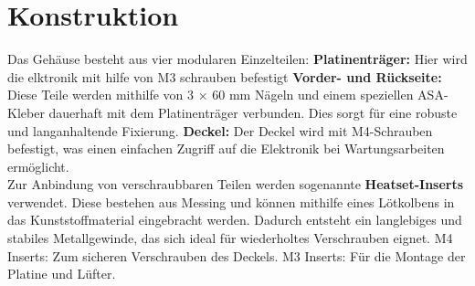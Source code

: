 \documentclass[paper=a4,11pt]{scrreprt}
\begin{document}
\section{Konstruktion}
Das Gehäuse besteht aus vier modularen Einzelteilen:
\textbf{Platinenträger:} Hier wird die elktronik mit hilfe von M3 schrauben befestigt
\textbf{Vorder- und Rückseite:} Diese Teile werden mithilfe von 3 × 60 mm Nägeln und einem speziellen ASA-Kleber dauerhaft mit dem Platinenträger verbunden. Dies sorgt für eine robuste und langanhaltende Fixierung.
\textbf{Deckel:} Der Deckel wird mit M4-Schrauben befestigt, was einen einfachen Zugriff auf die Elektronik bei Wartungsarbeiten ermöglicht.\\
Zur Anbindung von verschraubbaren Teilen werden sogenannte \textbf{Heatset-Inserts} verwendet. Diese bestehen aus Messing und können mithilfe eines Lötkolbens in das Kunststoffmaterial eingebracht werden. Dadurch entsteht ein langlebiges und stabiles Metallgewinde, das sich ideal für wiederholtes Verschrauben eignet.
M4 Inserts: Zum sicheren Verschrauben des Deckels.
M3 Inserts: Für die Montage der Platine und Lüfter.
\end{document}
